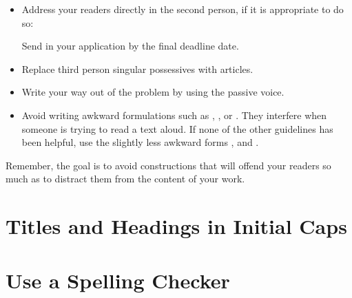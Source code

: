 \begin{itemize}



\item Address your readers directly in the second person, if it is
  appropriate to do so:

{Send in your application by the final deadline date.}




\item Replace third person singular possessives with articles.




\item Write your way out of the problem by using the passive voice.




\item Avoid writing awkward formulations such as , ,
  or .  They interfere when someone is trying to read a
  text aloud.  If none of the other guidelines has been helpful, use
  the slightly less awkward forms , and .

\end{itemize}
Remember, the goal is to avoid constructions that will offend your
readers so much as to distract them from the content of your work.




\section{Titles and Headings in Initial Caps}









\section{Use a Spelling Checker}

